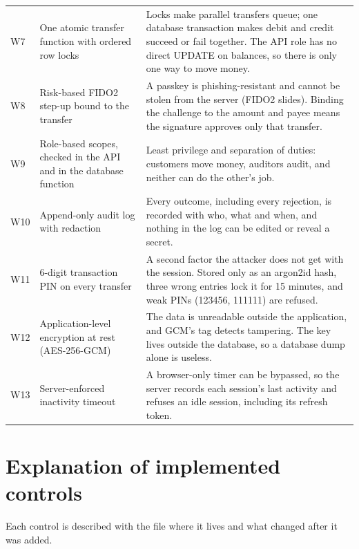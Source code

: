 \documentclass[11pt,a4paper]{article}
\begin{document}
\begin{table}[H]
\begin{tabularx}{\textwidth}{lP{4.4cm}Y}
W7 & One atomic transfer function with ordered row locks & Locks make parallel transfers queue; one database transaction makes debit and credit succeed or fail together. The API role has no direct UPDATE on balances, so there is only one way to move money. \\
W8 & Risk-based FIDO2 step-up bound to the transfer & A passkey is phishing-resistant and cannot be stolen from the server (FIDO2 slides). Binding the challenge to the amount and payee means the signature approves only that transfer. \\
W9 & Role-based scopes, checked in the API and in the database function & Least privilege and separation of duties: customers move money, auditors audit, and neither can do the other's job. \\
W10 & Append-only audit log with redaction & Every outcome, including every rejection, is recorded with who, what and when, and nothing in the log can be edited or reveal a secret. \\
W11 & 6-digit transaction PIN on every transfer & A second factor the attacker does not get with the session. Stored only as an argon2id hash, three wrong entries lock it for 15 minutes, and weak PINs (123456, 111111) are refused. \\
W12 & Application-level encryption at rest (AES-256-GCM) & The data is unreadable outside the application, and GCM's tag detects tampering. The key lives outside the database, so a database dump alone is useless. \\
W13 & Server-enforced inactivity timeout & A browser-only timer can be bypassed, so the server records each session's last activity and refuses an idle session, including its refresh token. \\
\bottomrule
\end{tabularx}
\end{table}

\section{Explanation of implemented controls}

Each control is described with the file where it lives and what changed after it was added.
\end{document}
